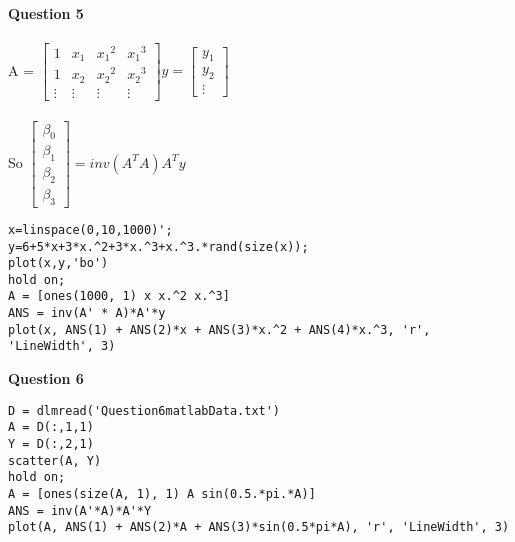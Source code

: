 \documentclass{article}
\begin{document}
\indent\\
\noindent\textbf{Question 5}
\\\\
A = $\begin{bmatrix}1&x_1&{x_1}^2&{x_1}^3\\1&x_2&{x_2}^2&{x_2}^3\\\vdots&\vdots&\vdots&\vdots\end{bmatrix} 
y = \begin{bmatrix}y_1\\y_2\\\vdots\end{bmatrix}$
\\\\
So $\begin{bmatrix}\beta_0\\\beta_1\\\beta_2\\\beta_3\end{bmatrix} = inv(A^TA)A^Ty$
\\
\begin{lstlisting}
x=linspace(0,10,1000)';
y=6+5*x+3*x.^2+3*x.^3+x.^3.*rand(size(x));
plot(x,y,'bo')
hold on;
A = [ones(1000, 1) x x.^2 x.^3]
ANS = inv(A' * A)*A'*y
plot(x, ANS(1) + ANS(2)*x + ANS(3)*x.^2 + ANS(4)*x.^3, 'r', 'LineWidth', 3)
\end{lstlisting}
\noindent\textbf{Question 6}
\begin{lstlisting}
D = dlmread('Question6matlabData.txt')
A = D(:,1,1)
Y = D(:,2,1)
scatter(A, Y)
hold on;
A = [ones(size(A, 1), 1) A sin(0.5.*pi.*A)]
ANS = inv(A'*A)*A'*Y
plot(A, ANS(1) + ANS(2)*A + ANS(3)*sin(0.5*pi*A), 'r', 'LineWidth', 3)
\end{lstlisting}
\end{document}
